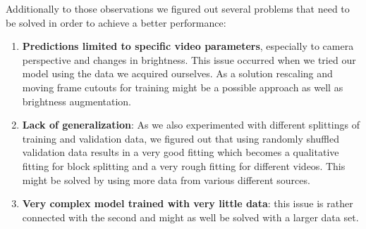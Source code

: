\documentclass[conference]{IEEEtran}
\begin{document}
Additionally to those observations we figured out several problems that need to be solved in order to achieve a better performance:
\begin{enumerate}[label=(\roman*)]
	\item \textbf{Predictions limited to specific video parameters}, especially to camera perspective and changes in brightness. This issue occurred when we tried our model using the data we acquired ourselves. As a solution rescaling and moving frame cutouts for training might be a possible approach as well as brightness augmentation.
	\item \textbf{Lack of generalization}: As we also experimented with different splittings of training and validation data, we figured out that using randomly shuffled validation data results in a very good fitting which becomes a qualitative fitting for block splitting and a very rough fitting for different videos. This might be solved by using more data from various different sources.
	\item \textbf{Very complex model trained with very little data}: this issue is rather connected with the second and might as well be solved with a larger data set.
\end{enumerate}




\printbibliography
\end{document}
